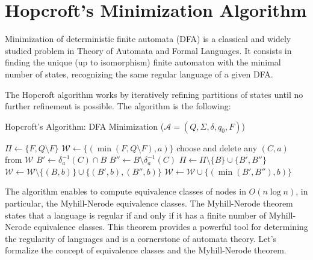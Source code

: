 \section{Hopcroft's Minimization Algorithm}
Minimization of deterministic finite automata (DFA) is a classical and widely studied problem in Theory of Automata and Formal Languages. It consists in finding the unique (up to isomorphism) finite automaton with the minimal number of states, recognizing the same regular language of a given DFA.

The Hopcroft algorithm works by iteratively refining partitions of states until no further refinement is possible. The algorithm is the following:

\begin{algorithm}
    \caption{Hopcroft's Algorithm: DFA Minimization ($\mathcal{A} = (Q, \Sigma, \delta, q_0, F)$)}
    \begin{algorithmic}[1]
        \State $\Pi \gets \{F, Q \setminus F\}$
            \State $\mathcal{W} \gets \{(\min(F, Q \setminus F), a)\}$
        \EndFor
            \State choose and delete any $(C, a)$ from $\mathcal{W}$
                    \State $B' \gets \delta_a^{-1}(C) \cap B$
                    \State $B'' \gets B \setminus \delta_a^{-1}(C)$
                    \State $\Pi \gets \Pi \setminus \{B\} \cup \{B', B''\}$
                            \State $\mathcal{W} \gets \mathcal{W} \setminus \{(B, b)\} \cup \{(B', b), (B'', b)\}$
                        \Else
                            \State $\mathcal{W} \gets \mathcal{W} \cup \{(\min(B', B''), b)\}$
                        \EndIf
                    \EndFor
                \EndIf
            \EndFor
        \EndWhile
    \end{algorithmic}
\end{algorithm}

The algorithm enables to compute equivalence classes of nodes in $O(n\log n)$, in particular, the Myhill-Nerode equivalence classes. The Myhill-Nerode theorem states that a language is regular if and only if it has a finite number of Myhill-Nerode equivalence classes. This theorem provides a powerful tool for determining the regularity of languages and is a cornerstone of automata theory. Let's formalize the concept of equivalence classes and the Myhill-Nerode theorem.

